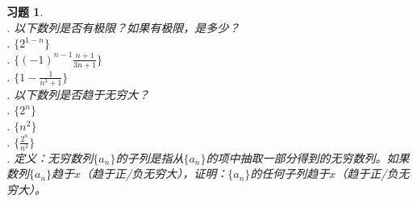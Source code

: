 \documentclass[12pt,UTF8]{ctexbook}
\newtheorem{xt}{习题}[section]
\begin{document}
\begin{xt}
    \mbox{} \\
    . 以下数列是否有极限？如果有极限，是多少？\\
    \indent{}. $\{2^{1-n}\}$ \\
    \indent{}. $\{(-1)^{n-1}\frac{n+1}{3n+1}\}$ \\
    \indent{}. $\{1 - \frac{1}{n^3+1}\}$ \\
    . 以下数列是否趋于无穷大？\\
    \indent{}. $\{2^{n}\}$ \\
    \indent{}. $\{n^2\}$ \\
    \indent{}. $\{\frac{2^n}{n^2}\}$\\
    . 定义：无穷数列$\{a_n\}$的子列是指从$\{a_n\}$的项中抽取一部分得到的无穷数列。如果数列$\{a_n\}$趋于$x$（趋于正/负无穷大），证明：$\{a_n\}$的任何子列趋于$x$（趋于正/负无穷大）。
\end{xt}
\end{document}

